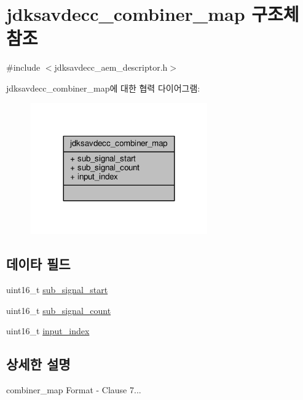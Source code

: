 \hypertarget{structjdksavdecc__combiner__map}{}\section{jdksavdecc\+\_\+combiner\+\_\+map 구조체 참조}
\label{structjdksavdecc__combiner__map}


{\ttfamily \#include $<$jdksavdecc\+\_\+aem\+\_\+descriptor.\+h$>$}



jdksavdecc\+\_\+combiner\+\_\+map에 대한 협력 다이어그램\+:
\nopagebreak
\begin{figure}[H]
\begin{center}
\leavevmode
\includegraphics[width=215pt]{structjdksavdecc__combiner__map__coll__graph}
\end{center}
\end{figure}
\subsection*{데이타 필드}
\begin{DoxyCompactItemize}
\item 
uint16\+\_\+t \hyperlink{structjdksavdecc__combiner__map_a4277ab8f00d35ea7381d919a79324a2f}{sub\+\_\+signal\+\_\+start}
\item 
uint16\+\_\+t \hyperlink{structjdksavdecc__combiner__map_a539ba5ac909f01c2b76e345233d20902}{sub\+\_\+signal\+\_\+count}
\item 
uint16\+\_\+t \hyperlink{structjdksavdecc__combiner__map_a36ce6cdc96dce790b947f5dee76ac21d}{input\+\_\+index}
\end{DoxyCompactItemize}


\subsection{상세한 설명}
combiner\+\_\+map Format -\/ Clause 7... 

